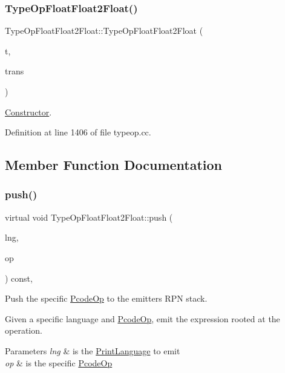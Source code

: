 \subsubsection{\texorpdfstring{TypeOpFloatFloat2Float()}{TypeOpFloatFloat2Float()}}
{\footnotesize\ttfamily Type\+Op\+Float\+Float2\+Float\+::\+Type\+Op\+Float\+Float2\+Float (\begin{DoxyParamCaption}\item[{\mbox{\hyperlink{class_type_factory}{Type\+Factory}} $\ast$}]{t,  }\item[{const \mbox{\hyperlink{class_translate}{Translate}} $\ast$}]{trans }\end{DoxyParamCaption})}



\mbox{\hyperlink{class_constructor}{Constructor}}. 



Definition at line 1406 of file typeop.\+cc.



\subsection{Member Function Documentation}
\mbox{\label{class_type_op_float_float2_float_a811e99c5160578b92050d6bc8900ed8a}} 
\subsubsection{\texorpdfstring{push()}{push()}}
{\footnotesize\ttfamily virtual void Type\+Op\+Float\+Float2\+Float\+::push (\begin{DoxyParamCaption}\item[{\mbox{\hyperlink{class_print_language}{Print\+Language}} $\ast$}]{lng,  }\item[{const \mbox{\hyperlink{class_pcode_op}{Pcode\+Op}} $\ast$}]{op }\end{DoxyParamCaption}) const\hspace{0.3cm}{\ttfamily [inline]}, {\ttfamily [virtual]}}



Push the specific \mbox{\hyperlink{class_pcode_op}{Pcode\+Op}} to the emitter\textquotesingle{}s R\+PN stack. 

Given a specific language and \mbox{\hyperlink{class_pcode_op}{Pcode\+Op}}, emit the expression rooted at the operation. 
\begin{DoxyParams}{Parameters}
{\em lng} & is the \mbox{\hyperlink{class_print_language}{Print\+Language}} to emit \\
\hline
{\em op} & is the specific \mbox{\hyperlink{class_pcode_op}{Pcode\+Op}} \\
\hline
\end{DoxyParams}


